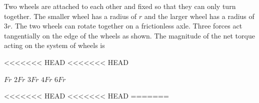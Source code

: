 \documentclass{../../oss-apphys-exam}
\begin{document}
\begin{multicols*}{2}
\begin{questions}
    \question Two wheels are attached to each other and fixed so that they can
    only turn together. The smaller wheel has a radius of $r$ and the larger
    wheel has a radius of $3r$. The two wheels can rotate together on a
    frictionless axle. Three forces act tangentially on the edge of the wheels
    as shown. The magnitude of the net torque acting on the system of wheels is
    \begin{center}
<<<<<<< HEAD
<<<<<<< HEAD
    \end{center}
    \begin{choices}
      \choice $Fr$
      \choice $2Fr$
      \choice $3Fr$
      \choice $4Fr$
      \choice $6Fr$
    \end{choices}
<<<<<<< HEAD
<<<<<<< HEAD
=======



\end{questions}
\end{multicols*}
\end{document}
